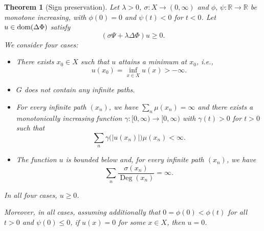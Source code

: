 \documentclass[letterpaper]{article}
\newtheorem{theorem}[lemma]{Theorem}
\theoremstyle{definition}
\theoremstyle{named}
\numberwithin{equation}{section}
\newcommand{\R}{\mathbb{R}}
\newcommand{\dom}{\textnormal{dom}} %
\newcommand{\Deg}{\operatorname{Deg}}
\begin{document}
\begin{theorem}[Sign preservation]\label{thm:min_principle}
Let $\lambda>0$, $\sigma \colon X \to (0, \infty)$ and $\phi, \,\psi \colon \R \to \R$ be monotone increasing, with
$\phi(0)=0$ and $\psi(t)<0$ for $t<0$.
Let $u \in \dom(\Delta \Phi)$ satisfy 
$$\left( \sigma \Psi + \lambda\Delta \Phi\right)u \geq 0.$$ 
We consider four cases:

\begin{itemize}
	\item[\emph{\textbf{Case 1:}}]
	There exists $x_0 \in X$ such that $u$ attains a minimum at $x_0$, i.e.,
	$$u(x_{0})=\inf_{x\in X} u(x) > -\infty.$$
	
	\item[\emph{\textbf{Case 2:}}] $G$ does not contain any infinite paths. 	

    \item[\emph{\textbf{Case 3:}}] For every infinite path $(x_{n})$, we have $\sum_{n} \mu(x_{n})=\infty$ and there exists  a monotonically increasing  function $\gamma \colon [0,\infty) \to [0,\infty)$ with  $\gamma(t)>0$ for $t>0$ such  that 
    $$
    \sum_{n}\gamma \bigl( |u(x_{n})| \bigr) \mu(x_{n})<\infty .
    $$
  \item[\emph{\textbf{Case 4:}}] The function $u$ is bounded below 
  and, for every infinite path $(x_{n})$, we have 
    $$\sum_{n} \frac{\sigma(x_n)}{\Deg(x_{n})}=\infty.$$
\end{itemize}    
	 In all four cases, $u \geq 0$. 
     
     Moreover, in all cases,
     { assuming additionally that $0=\phi(0)<\phi(t)$ for all $t>0$ and $\psi(0)\leq 0$}, if $u(x)=0$ for some $x\in X$, then  $u= 0$. 
\end{theorem}
\end{document}
